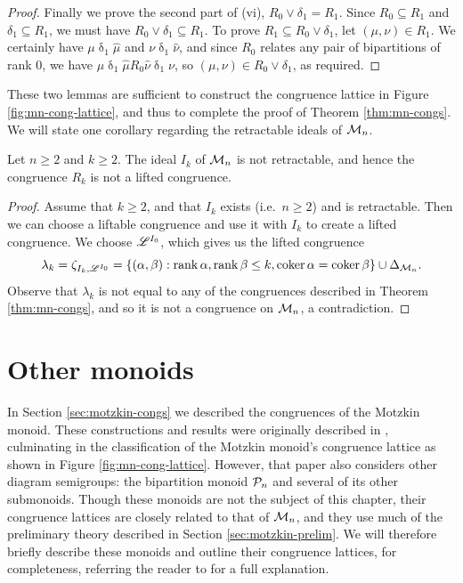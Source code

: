\begin{lemma}
\begin{proof}
    Finally we prove the second part of (vi), $R_0 \vee \delta_1 = R_1$.  Since
    $R_0 \subseteq R_1$ and $\delta_1 \subseteq R_1$, we must have
    $R_0 \vee \delta_1 \subseteq R_1$.  To prove
    $R_1 \subseteq R_0 \vee \delta_1$, let $(\mu, \nu) \in R_1$.  We certainly
    have $\mu \mathrel\delta_1 \widehat\mu$ and
    $\nu \mathrel\delta_1 \widehat\nu$, and since $R_0$ relates any pair of
    bipartitions of rank $0$, we have
    $\mu \mathrel\delta_1 \widehat\mu \mathrel{R_0} \widehat\nu \mathrel\delta_1
    \nu$, so $(\mu, \nu) \in R_0 \vee \delta_1$, as required.
  \end{proof}
\end{lemma}

These two lemmas are sufficient to construct the congruence lattice in Figure
\ref{fig:mn-cong-lattice}, and thus to complete the proof of Theorem
\ref{thm:mn-congs}.  We will state one corollary regarding the retractable
ideals of $\mathcal{M}_n$.

\begin{corollary}
  \label{cor:rk-not-lifted}
  Let $n \geq 2$ and $k \geq 2$.  The ideal $I_k$ of $\mathcal{M}_n$ is not retractable, and hence the congruence $R_k$
  is not a lifted congruence.
  \begin{proof}
    Assume that $k \geq 2$, and that $I_k$ exists (i.e.~$n \geq 2$) and is
    retractable.  Then we can choose a liftable congruence and use it with $I_k$
    to create a lifted congruence.  We choose $\mathscr{L}^{I_0}$, which gives us the
    lifted congruence
    $$\lambda_k = \zeta_{I_k, \mathscr{L}^{I_0}}
    = \{(\alpha,\beta) :
    \operatorname{rank}\alpha,\operatorname{rank}\beta \leq k,
    \operatorname{coker}\alpha = \operatorname{coker}\beta\} \cup \Delta_{\mathcal{M}_n}.$$
    Observe that $\lambda_k$ is not equal to any of the congruences described in
    Theorem \ref{thm:mn-congs}, and so it is not a congruence on $\mathcal{M}_n$, a
    contradiction.
  \end{proof}
\end{corollary}

\section{Other monoids}
\label{sec:motzkin-other}
In Section \ref{sec:motzkin-congs} we described the congruences of the Motzkin
monoid.  These constructions and results were originally described in
\cite{ourpaper}, culminating in the classification of the Motzkin monoid's
congruence lattice as shown in Figure \ref{fig:mn-cong-lattice}.  However, that
paper also considers other diagram semigroups: the bipartition monoid $\mathcal{P}_n$
and several of its other submonoids.  Though these monoids are not the subject
of this chapter, their congruence lattices are closely related to that of
$\mathcal{M}_n$, and they use much of the preliminary theory described in Section
\ref{sec:motzkin-prelim}.  We will therefore briefly describe these monoids and
outline their congruence lattices, for completeness, referring the reader to
\cite{ourpaper} for a full explanation.

